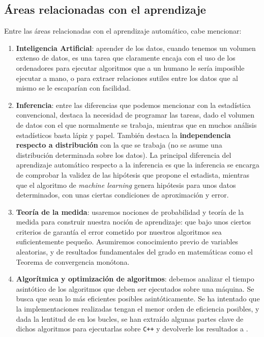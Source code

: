  \subsection{Áreas relacionadas con el aprendizaje}
 Entre las áreas relacionadas con el aprendizaje automático, cabe mencionar:

 \begin{enumerate}[i]
  \item \textbf{Inteligencia Artificial}: aprender de los datos, cuando tenemos un volumen extenso de datos, es una tarea que 
  claramente encaja con el uso de los ordenadores para ejecutar algoritmos que a un humano le sería imposible ejecutar a mano, o para
  extraer relaciones sutiles entre los datos que al mismo se le escaparían con facilidad.
  
  \item \textbf{Inferencia}: entre las diferencias que podemos mencionar con la estadística convencional, destaca 
  la necesidad de programar las tareas, dado el volumen de datos con el que normalmente se trabaja, mientras que en muchos análisis 
  estadísticos basta lápiz y papel. También destaca la \textbf{independencia respecto a distribución} con la que se trabaja (no se
  asume una distribución determinada sobre los datos). La principal diferencia del aprendizaje automático respecto a la inferencia 
  es que la inferencia se encarga de comprobar la validez de las hipótesis que propone el estadista, mientras que el algoritmo de
  \textit{machine learning} genera hipótesis para unos datos determinados, con unas ciertas condiciones de aproximación y error.
 
  \item \textbf{Teoría de la medida}: usaremos nociones de probabilidad y teoría de la medida para construir nuestra noción de 
  aprendizaje: que bajo unos ciertos criterios de garantía el error cometido por nuestros algoritmos sea suficientemente pequeño. 
  Asumiremos conocimiento previo de variables aleatorias, y de resultados fundamentales del grado en matemáticas como el Teorema de
  convergencia monótona.
  
  \item \textbf{Algorítmica y optimización de algoritmos}: debemos analizar el tiempo asintótico de los algoritmos que deben ser ejecutados
  sobre una máquina. Se busca que sean lo más eficientes posibles asintóticamente. Se ha intentado que la implementaciones realizadas 
  tengan el menor orden de eficiencia posibles, y dada la lentitud de \R en los bucles, se han extraído algunas partes clave de dichos 
  algoritmos para ejecutarlas sobre \texttt{C++} y devolverle los resultados a \R.
 \end{enumerate}
 
